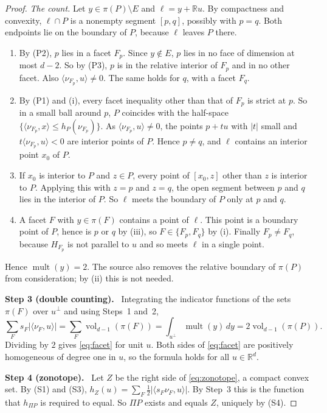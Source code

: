 \documentclass[11pt]{article}
\newcommand{\R}{\mathbb R}
\DeclareMathOperator{\vol}{vol}
\DeclareMathOperator{\mult}{mult}
\newcommand{\step}[1]{\par\smallskip\noindent\textbf{#1}\ }
\begin{document}
\begin{proof}
\emph{The count.} Let \(y\in\pi(P)\setminus E\) and
\(\ell=y+\R u\). By compactness and convexity, \(\ell\cap P\) is a nonempty
segment \([p,q]\), possibly with \(p=q\). Both endpoints lie on the
boundary of \(P\), because \(\ell\) leaves \(P\) there.
\begin{enumerate}[label=(\roman*),leftmargin=2.5em,itemsep=2pt]
\item By (P2), \(p\) lies in a facet \(F_p\). Since \(y\notin E\), \(p\)
 lies in no face of dimension at most \(d-2\). So by (P3), \(p\) is in the
 relative interior of \(F_p\) and in no other facet. Also
 \(\langle\nu_{F_p},u\rangle\ne0\). The same holds for \(q\), with a facet
 \(F_q\).
\item By (P1) and (i), every facet inequality other than that of \(F_p\) is
 strict at \(p\). So in a small ball around \(p\), \(P\) coincides with the
 half-space \(\{\langle\nu_{F_p},x\rangle\le h_P(\nu_{F_p})\}\). As
 \(\langle\nu_{F_p},u\rangle\ne0\), the points \(p+tu\) with \(|t|\) small
 and \(t\langle\nu_{F_p},u\rangle<0\) are interior points of \(P\). Hence
 \(p\ne q\), and \(\ell\) contains an interior point \(x_0\) of \(P\).
\item If \(x_0\) is interior to \(P\) and \(z\in P\), every point of
 \([x_0,z]\) other than \(z\) is interior to \(P\). Applying this with
 \(z=p\) and \(z=q\), the open segment between \(p\) and \(q\) lies in the
 interior of \(P\). So \(\ell\) meets the boundary of \(P\) only at \(p\)
 and \(q\).
\item A facet \(F\) with \(y\in\pi(F)\) contains a point of \(\ell\). This
 point is a boundary point of \(P\), hence is \(p\) or \(q\) by (iii), so
 \(F\in\{F_p,F_q\}\) by (i). Finally \(F_p\ne F_q\), because \(H_{F_p}\) is
 not parallel to \(u\) and so meets \(\ell\) in a single point.
\end{enumerate}
Hence \(\mult(y)=2\). The source also removes the relative boundary of
\(\pi(P)\) from consideration; by (ii) this is not needed.

\step{Step 3 (double counting).} Integrating the indicator functions of
the sets \(\pi(F)\) over \(u^\perp\) and using Steps~1 and~2,
\[
 \sum_F s_F|\langle\nu_F,u\rangle|
 =\sum_F\vol_{d-1}(\pi(F))
 =\int_{u^\perp}\mult(y)\,dy
 =2\vol_{d-1}(\pi(P)).
\]
Dividing by \(2\) gives \eqref{eq:facet} for unit \(u\). Both sides of
\eqref{eq:facet} are positively homogeneous of degree one in \(u\), so the
formula holds for all \(u\in\R^d\).

\step{Step 4 (zonotope).} Let \(Z\) be the right side of
\eqref{eq:zonotope}, a compact convex set. By (S1) and (S3),
\(h_Z(u)=\sum_F\tfrac12|\langle s_F\nu_F,u\rangle|\). By Step~3 this is the
function that \(h_{\Pi P}\) is required to equal. So \(\Pi P\) exists and
equals \(Z\), uniquely by (S4).
\end{proof}
\end{document}
